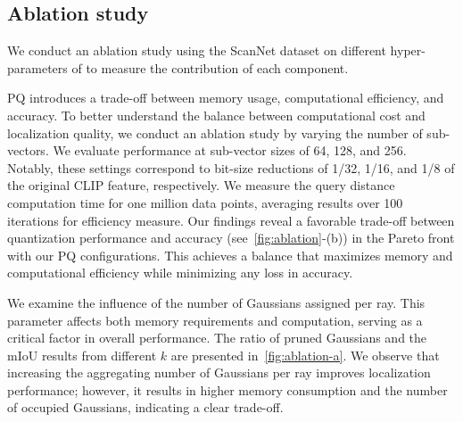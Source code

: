\subsection{Ablation study}
\label{subsec:5_4}
We conduct an ablation study using the ScanNet dataset on different hyper-parameters of \nickname to measure the contribution of each component.

PQ introduces a trade-off between memory usage, computational efficiency, and accuracy. 
To better understand the balance between computational cost and localization quality, we conduct an ablation study by varying the number of sub-vectors. We evaluate performance at sub-vector sizes of 64, 128, and 256. Notably, these settings correspond to bit-size reductions of 1/32, 1/16, and 1/8 of the original CLIP feature, respectively. We measure the query distance computation time for one million data points, averaging results over 100 iterations for efficiency measure. Our findings reveal a favorable trade-off between quantization performance and accuracy (see~\cref{fig:ablation}-(b)) in the Pareto front with our PQ configurations. This achieves a balance that maximizes memory and computational efficiency while minimizing any loss in accuracy.

We examine the influence of the number of Gaussians assigned per ray. This parameter affects both memory requirements and computation, serving as a critical factor in overall performance. The ratio of pruned Gaussians and the mIoU results from different $k$ are presented in~\cref{fig:ablation-a}. We observe that increasing the aggregating number of Gaussians per ray improves localization performance; however, it results in higher memory consumption and the number of occupied Gaussians, indicating a clear trade-off.

